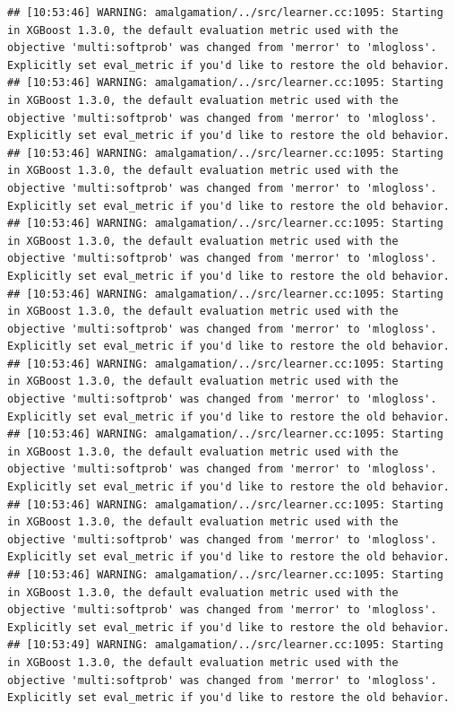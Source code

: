 \documentclass[
]{scrbook}
\begin{document}
\begin{verbatim}
## [10:53:46] WARNING: amalgamation/../src/learner.cc:1095: Starting in XGBoost 1.3.0, the default evaluation metric used with the objective 'multi:softprob' was changed from 'merror' to 'mlogloss'. Explicitly set eval_metric if you'd like to restore the old behavior.
## [10:53:46] WARNING: amalgamation/../src/learner.cc:1095: Starting in XGBoost 1.3.0, the default evaluation metric used with the objective 'multi:softprob' was changed from 'merror' to 'mlogloss'. Explicitly set eval_metric if you'd like to restore the old behavior.
## [10:53:46] WARNING: amalgamation/../src/learner.cc:1095: Starting in XGBoost 1.3.0, the default evaluation metric used with the objective 'multi:softprob' was changed from 'merror' to 'mlogloss'. Explicitly set eval_metric if you'd like to restore the old behavior.
## [10:53:46] WARNING: amalgamation/../src/learner.cc:1095: Starting in XGBoost 1.3.0, the default evaluation metric used with the objective 'multi:softprob' was changed from 'merror' to 'mlogloss'. Explicitly set eval_metric if you'd like to restore the old behavior.
## [10:53:46] WARNING: amalgamation/../src/learner.cc:1095: Starting in XGBoost 1.3.0, the default evaluation metric used with the objective 'multi:softprob' was changed from 'merror' to 'mlogloss'. Explicitly set eval_metric if you'd like to restore the old behavior.
## [10:53:46] WARNING: amalgamation/../src/learner.cc:1095: Starting in XGBoost 1.3.0, the default evaluation metric used with the objective 'multi:softprob' was changed from 'merror' to 'mlogloss'. Explicitly set eval_metric if you'd like to restore the old behavior.
## [10:53:46] WARNING: amalgamation/../src/learner.cc:1095: Starting in XGBoost 1.3.0, the default evaluation metric used with the objective 'multi:softprob' was changed from 'merror' to 'mlogloss'. Explicitly set eval_metric if you'd like to restore the old behavior.
## [10:53:46] WARNING: amalgamation/../src/learner.cc:1095: Starting in XGBoost 1.3.0, the default evaluation metric used with the objective 'multi:softprob' was changed from 'merror' to 'mlogloss'. Explicitly set eval_metric if you'd like to restore the old behavior.
## [10:53:46] WARNING: amalgamation/../src/learner.cc:1095: Starting in XGBoost 1.3.0, the default evaluation metric used with the objective 'multi:softprob' was changed from 'merror' to 'mlogloss'. Explicitly set eval_metric if you'd like to restore the old behavior.
## [10:53:49] WARNING: amalgamation/../src/learner.cc:1095: Starting in XGBoost 1.3.0, the default evaluation metric used with the objective 'multi:softprob' was changed from 'merror' to 'mlogloss'. Explicitly set eval_metric if you'd like to restore the old behavior.

\end{verbatim}
\end{document}
